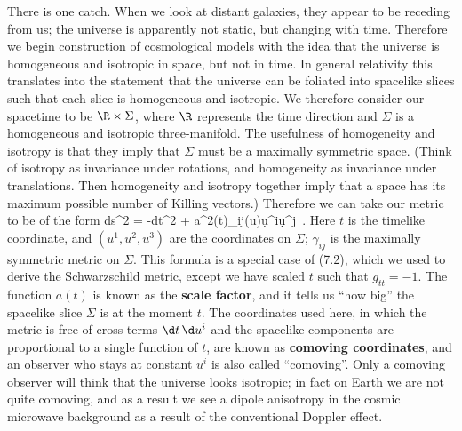 There is one catch.  When we look at distant galaxies, they appear
to be receding from us; the universe is apparently not static, but
changing with time.  Therefore we begin construction of cosmological
models with the idea that the universe is homogeneous and isotropic
in space, but not in time.  In general relativity this translates into
the statement that the universe can be foliated into spacelike slices
such that each slice is homogeneous and isotropic.  
We therefore consider our spacetime to be $\R\times\Sigma$, where
$\R$ represents the time direction and $\Sigma$ is a homogeneous and
isotropic three-manifold.  The usefulness of homogeneity and 
isotropy is that they imply that $\Sigma$ must be a maximally
symmetric space.  (Think of isotropy as invariance under rotations,
and homogeneity as invariance under translations.  Then homogeneity
and isotropy together imply that a space has its maximum possible
number of Killing vectors.)  Therefore
we can take our metric to be of the form
\be
  ds^2 = -dt^2 + a^2(t)\gamma_{ij}(u)\d u^i\d u^j\ .\label{8.1}
\ee
Here $t$ is the timelike coordinate, and $(u^1, u^2, u^3)$ are the
coordinates on $\Sigma$; $\gamma_{ij}$ is the maximally symmetric
metric on $\Sigma$.  This formula is a special case of (7.2), which we
used to derive the Schwarzschild metric, except we have scaled $t$
such that $g_{tt}=-1$.  The function $a(t)$ is known as the 
{\bf scale factor}, and it tells us ``how big'' the spacelike
slice $\Sigma$ is at the moment $t$.  The coordinates used here,
in which the metric is free of cross terms $\d t\,\d u^i$ and the
spacelike components are proportional to a single function of $t$, are 
known as {\bf comoving coordinates}, and an observer who stays at constant
$u^i$ is also called ``comoving''.  Only a comoving observer will
think that the universe looks isotropic; in fact on Earth we are
not quite comoving, and as a result we see a dipole anisotropy in
the cosmic microwave background as a result of the conventional
Doppler effect.


